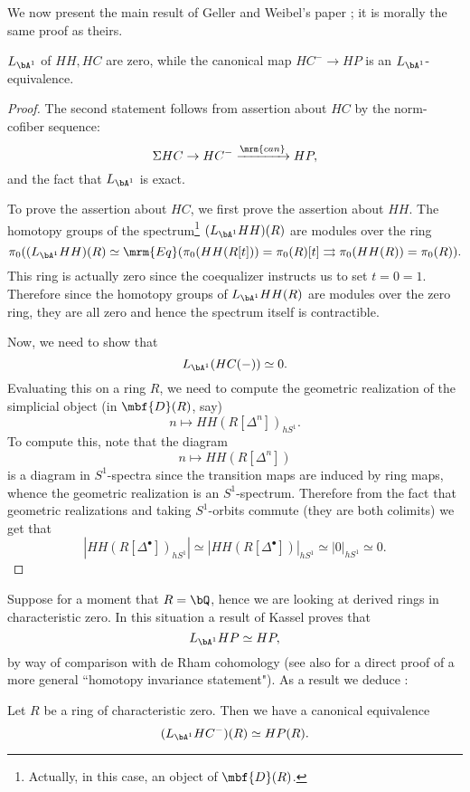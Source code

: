\documentclass[a4paper,10pt]{amsart}
\begin{document}
 We now present the main result of Geller and Weibel's paper \cite[Theorem 2.1]{geller-weibel}; it is morally the same proof as theirs.

\begin{thm}\label{lem:hh} $L_{\bA^1}$ of $HH, HC$ are zero, while the canonical map $HC^- \rightarrow HP$ is an $L_{\bA^1}$-equivalence.
\end{thm}

\begin{proof} The second statement follows from assertion about $HC$ by the norm-cofiber sequence:
\[
\Sigma HC \rightarrow HC^- \xrightarrow{\mrm{can}} HP,
\]
 and the fact that $L_{\bA^1}$ is exact.

To prove the assertion about $HC$, we first prove the assertion about $HH$. The homotopy groups of the spectrum\footnote{Actually, in this case, an object of $\mbf{D}(R)$.} $(L_{\bA^1}HH)(R)$ are modules over the ring
\[
\pi_0((L_{\bA^1}HH)(R) \simeq \mrm{Eq}(\pi_0(HH(R[t])) = \pi_0(R)[t] \rightrightarrows \pi_0(HH(R))=\pi_0(R)).
\] This ring is actually zero since the coequalizer instructs us to set $t=0=1$. Therefore since the homotopy groups of $L_{\bA^1}HH(R)$ are modules over the zero ring, they are all zero and hence the spectrum itself is contractible.


Now, we need to show that
\[
L_{\bA^1}(HC(-)) \simeq 0.
\]
Evaluating this on a ring $R$, we need to compute the geometric realization of the simplicial object (in $\mbf{D}(R)$, say)
\[
n \mapsto HH(R[\Delta^{n}])_{hS^1}.
\] To compute this, note that the diagram 
\[
n \mapsto HH(R[\Delta^n])
\]
is a diagram in $S^1$-spectra since the transition maps are induced by ring maps, whence the geometric realization is an $S^1$-spectrum. Therefore from the fact that geometric realizations and taking $S^1$-orbits commute (they are both colimits) we get that 
\[
|HH(R[\Delta^{\bullet}])_{hS^1}| \simeq |HH(R[\Delta^{\bullet}])|_{hS^1} \simeq |0|_{hS^1} \simeq 0.
\]
\qedhere\end{proof}

\sssec{} Suppose for a moment that $R = \bQ$, hence we are looking at derived rings in characteristic zero. In this situation a result of Kassel \cite[Corollary 3.13]{kassel} proves that 
\[
L_{\bA^1}HP \simeq HP,
\] by way of comparison with de Rham cohomology (see also \cite[Theorem III.5.1]{goodwillie-loopspace} for a direct proof of a more general ``homotopy invariance statement"). As a result we deduce \cite[Theorem 4.1]{geller-weibel}:
\begin{cor}\label{cor:gw} Let $R$ be a ring of characteristic zero. Then we have a canonical equivalence 
\[
(L_{\bA^1}HC^-)(R) \simeq HP(R).
\]
\end{cor}
\end{document}
